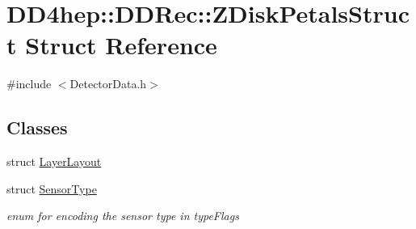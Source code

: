 \hypertarget{struct_d_d4hep_1_1_d_d_rec_1_1_z_disk_petals_struct}{
\section{DD4hep::DDRec::ZDiskPetalsStruct Struct Reference}
\label{struct_d_d4hep_1_1_d_d_rec_1_1_z_disk_petals_struct}
}


{\ttfamily \#include $<$DetectorData.h$>$}\subsection*{Classes}
\begin{DoxyCompactItemize}
\item 
struct \hyperlink{struct_d_d4hep_1_1_d_d_rec_1_1_z_disk_petals_struct_1_1_layer_layout}{LayerLayout}
\item 
struct \hyperlink{struct_d_d4hep_1_1_d_d_rec_1_1_z_disk_petals_struct_1_1_sensor_type}{SensorType}
\begin{DoxyCompactList}\small\item\em enum for encoding the sensor type in typeFlags \item\end{DoxyCompactList}\end{DoxyCompactItemize}
